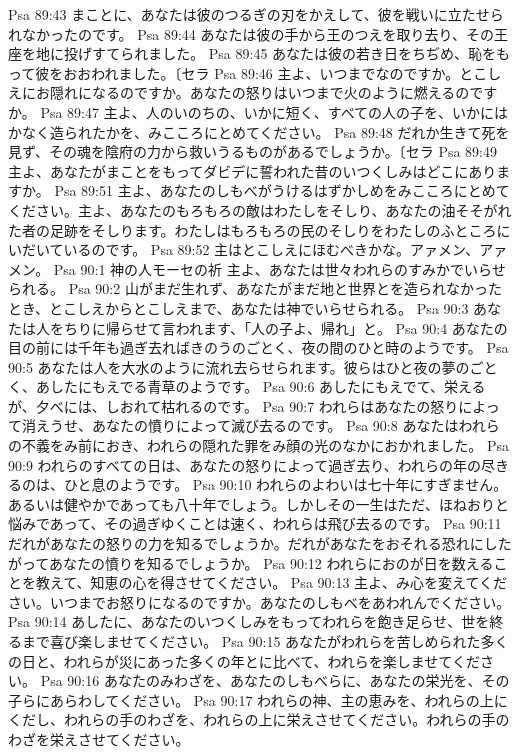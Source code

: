 Psa 89:43  まことに、あなたは彼のつるぎの刃をかえして、彼を戦いに立たせられなかったのです。
Psa 89:44  あなたは彼の手から王のつえを取り去り、その王座を地に投げすてられました。
Psa 89:45  あなたは彼の若き日をちぢめ、恥をもって彼をおおわれました。〔セラ
Psa 89:46  主よ、いつまでなのですか。とこしえにお隠れになるのですか。あなたの怒りはいつまで火のように燃えるのですか。
Psa 89:47  主よ、人のいのちの、いかに短く、すべての人の子を、いかにはかなく造られたかを、みこころにとめてください。
Psa 89:48  だれか生きて死を見ず、その魂を陰府の力から救いうるものがあるでしょうか。〔セラ
Psa 89:49  主よ、あなたがまことをもってダビデに誓われた昔のいつくしみはどこにありますか。
Psa 89:51  主よ、あなたのしもべがうけるはずかしめをみこころにとめてください。主よ、あなたのもろもろの敵はわたしをそしり、あなたの油そそがれた者の足跡をそしります。わたしはもろもろの民のそしりをわたしのふところにいだいているのです。
Psa 89:52  主はとこしえにほむべきかな。アァメン、アァメン。
Psa 90:1  神の人モーセの祈 主よ、あなたは世々われらのすみかでいらせられる。
Psa 90:2  山がまだ生れず、あなたがまだ地と世界とを造られなかったとき、とこしえからとこしえまで、あなたは神でいらせられる。
Psa 90:3  あなたは人をちりに帰らせて言われます、「人の子よ、帰れ」と。
Psa 90:4  あなたの目の前には千年も過ぎ去ればきのうのごとく、夜の間のひと時のようです。
Psa 90:5  あなたは人を大水のように流れ去らせられます。彼らはひと夜の夢のごとく、あしたにもえでる青草のようです。
Psa 90:6  あしたにもえでて、栄えるが、夕べには、しおれて枯れるのです。
Psa 90:7  われらはあなたの怒りによって消えうせ、あなたの憤りによって滅び去るのです。
Psa 90:8  あなたはわれらの不義をみ前におき、われらの隠れた罪をみ顔の光のなかにおかれました。
Psa 90:9  われらのすべての日は、あなたの怒りによって過ぎ去り、われらの年の尽きるのは、ひと息のようです。
Psa 90:10  われらのよわいは七十年にすぎません。あるいは健やかであっても八十年でしょう。しかしその一生はただ、ほねおりと悩みであって、その過ぎゆくことは速く、われらは飛び去るのです。
Psa 90:11  だれがあなたの怒りの力を知るでしょうか。だれがあなたをおそれる恐れにしたがってあなたの憤りを知るでしょうか。
Psa 90:12  われらにおのが日を数えることを教えて、知恵の心を得させてください。
Psa 90:13  主よ、み心を変えてください。いつまでお怒りになるのですか。あなたのしもべをあわれんでください。
Psa 90:14  あしたに、あなたのいつくしみをもってわれらを飽き足らせ、世を終るまで喜び楽しませてください。
Psa 90:15  あなたがわれらを苦しめられた多くの日と、われらが災にあった多くの年とに比べて、われらを楽しませてください。
Psa 90:16  あなたのみわざを、あなたのしもべらに、あなたの栄光を、その子らにあらわしてください。
Psa 90:17  われらの神、主の恵みを、われらの上にくだし、われらの手のわざを、われらの上に栄えさせてください。われらの手のわざを栄えさせてください。
